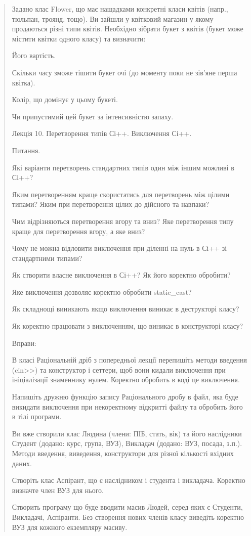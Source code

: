 \documentclass[]{article}
\begin{document}
\begin{quote}
Задано клас Flower, що має нащадками конкретні класи квітів (напр.,
тюльпан, троянд, тощо). Ви зайшли у квітковий магазин у якому продаються
різні типи квітів. Необхідно зібрати букет з квітів (букет може містити
квітки одного класу) та визначити:

Його вартість.

Скільки часу зможе тішити букет очі (до моменту поки не зів'яне перша
квітка).

Колір, що домінує у цьому букеті.

Чи припустимий цей букет за інтенсивністю запаху.

\protect\hypertarget{_Hlk54461890}{}{}Лекція 10. Перетворення типів
Сі++. Виключення Сі++.

\protect\hypertarget{_Hlk57988995}{}{}Питання.

Які варіанти перетворень стандартних типів один між іншим можливі в
Сі++?

Яким перетворенням краще скористатись для перетворень між цілими типами?
Яким при перетворення цілих до дійсного та навпаки?

Чим відрізняються перетворення вгору та вниз? Яке перетворення типу
краще для перетворення вгору, а яке вниз?

Чому не можна відловити виключення при діленні на нуль в Сі++ зі
стандартними типами?

Як створити власне виключення в Сі++? Як його коректно обробити?

Яке виключення дозволяє коректно обробити static\_cast?

Як складнощі виникають якщо виключення виникає в деструкторі класу?

Як коректно працювати з виключенням, що виникає в конструкторі класу?

Вправи:

\protect\hypertarget{_Hlk65951676}{}{}В класі Раціональній дріб з
попередньої лекції перепишіть методи введення
(cin\textgreater{}\textgreater{}) та конструктор і сеттери, щоб вони
кидали виключення при ініціалізації знаменнику нулем. Коректно обробить
в коді це виключення.

Напишіть дружню функцію запису Раціонального дробу в файл, яка буде
викидати виключення при некоректному відкритті файлу та обробить його в
тілі програми.

\protect\hypertarget{_Hlk65951695}{}{}Ви вже створили клас Людина
(члени: ПІБ, стать, вік) та його наслідники Студент (додано: курс,
група, ВУЗ), Викладач (додано: ВУЗ, посада, з.п.). Методи введення,
виведення, конструктори для різної кількості вхідних даних.

Створіть клас Аспірант, що є наслідником і студента і викладача.
Коректно визначте член ВУЗ для нього.

Створить програму що буде вводити масив Людей, серед яких є Студенти,
Викладачі, Аспіранти. Без створення нових членів класу виведіть коректно
ВУЗ для кожного екземпляру масиву.
\end{quote}
\end{document}
